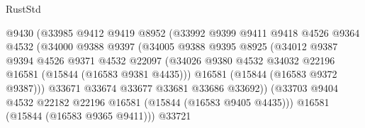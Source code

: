 \begin{lexlean}{RustStd}
\begin{coremodule}
                                    @9430
                                    (@33985
                                      @9412
                                      @9419
                                      @8952
                                      (@33992
                                        @9399
                                        @9411
                                        @9418
                                        @4526
                                        @9364
                                        @4532
                                        (@34000
                                          @9388
                                          @9397
                                          (@34005
                                            @9388
                                            @9395
                                            @8925
                                            (@34012
                                              @9387
                                              @9394
                                              @4526
                                              @9371
                                              @4532
                                              @22097
                                              (@34026
                                                @9380
                                                @4532
                                                @34032
                                                @22196
                                                @16581
                                                (@15844 (@16583 @9381 @4435)))
                                              @16581
                                              (@15844 (@16583 @9372 @9387)))
                                            @33671
                                            @33674
                                            @33677
                                            @33681
                                            @33686
                                            @33692))
                                        (@33703
                                          @9404
                                          @4532
                                          @22182
                                          @22196
                                          @16581
                                          (@15844 (@16583 @9405 @4435)))
                                        @16581
                                        (@15844 (@16583 @9365 @9411)))
                                      @33721

\end{coremodule}
\end{lexlean}
